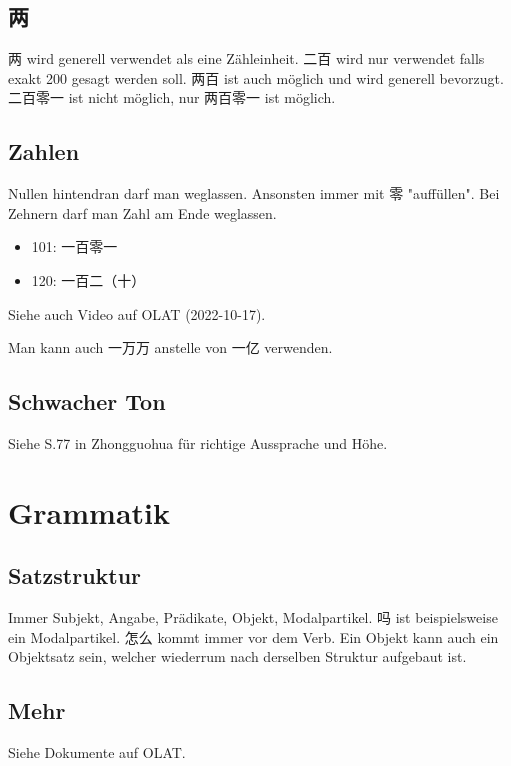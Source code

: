 \documentclass[UTF8]{ctexart}
\begin{document}
\subsection{两}

两 wird generell verwendet als eine Zähleinheit. 二百 wird nur verwendet falls exakt 200 gesagt werden soll. 两百 ist auch möglich und wird generell bevorzugt. 二百零一 ist nicht möglich, nur 两百零一 ist möglich.

\subsection{Zahlen}

Nullen hintendran darf man weglassen. Ansonsten immer mit 零 "auffüllen". Bei Zehnern darf man Zahl am Ende weglassen.

\begin{itemize}
    \item 101: 一百零一
    \item 120: 一百二（十）
\end{itemize}

Siehe auch Video auf OLAT (2022-10-17).

Man kann auch 一万万 anstelle von 一亿 verwenden.


\subsection{Schwacher Ton}

Siehe S.77 in Zhongguohua für richtige Aussprache und Höhe.

\section{Grammatik}

\subsection{Satzstruktur}

Immer Subjekt, Angabe, Prädikate, Objekt, Modalpartikel.
吗 ist beispielsweise ein Modalpartikel. 怎么 kommt immer vor dem Verb. Ein Objekt kann auch ein Objektsatz sein, welcher wiederrum nach derselben Struktur aufgebaut ist.

\subsection{Mehr}

Siehe Dokumente auf OLAT.
\end{document}

